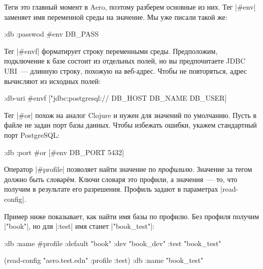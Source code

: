 Теги это главный момент в Aero, поэтому разберем основные из них. Тег
\spverb|#env| заменяет имя переменной среды на значение. Мы уже писали такой
же:

\begin{english}
  \begin{clojure}
{:db {:passwod #env DB_PASS}}
  \end{clojure}
\end{english}

Тег \spverb|#envf| форматирует строку переменными среды. Предположим,
подключение к базе состоит из отдельных полей, но вы предпочитаете JDBC URI~---
длинную строку, похожую на веб-адрес. Чтобы не повторяться, адрес вычисляют из
исходных полей:

\begin{english}
  \begin{clojure}
{:db-uri #envf ["jdbc:postgresql://%
                DB_HOST DB_NAME DB_USER]}
  \end{clojure}
\end{english}

Тег \spverb|#or| похож на аналог Clojure и нужен для значений по
умолчанию. Пусть в файле не задан порт базы данных. Чтобы избежать ошибки,
укажем стандартный порт PostgreSQL:

\begin{english}
  \begin{clojure}
{:db {:port #or [#env DB_PORT 5432]}}
  \end{clojure}
\end{english}


Оператор \spverb|#profile| позволяет найти значение по
\emph{профилилю}. Значение за тегом должно быть словар\"{е}м. Ключи словаря это
профили, а значения~--- то, что получим в результате его разрешения. Профиль
задают в параметрах \spverb|read-config|.

Пример ниже показывает, как найти имя базы по профилю. Без профиля получим
\spverb|"book"|, но для \spverb|:test| имя станет \spverb|"book_test"|:

\begin{english}
  \begin{clojure}
{:db {:name #profile {:default "book"
                      :dev     "book_dev"
                      :test    "book_test"}}}

(read-config "aero.test.edn" {:profile :test})
{:db {:name "book_test"}}
  \end{clojure}
\end{english}

